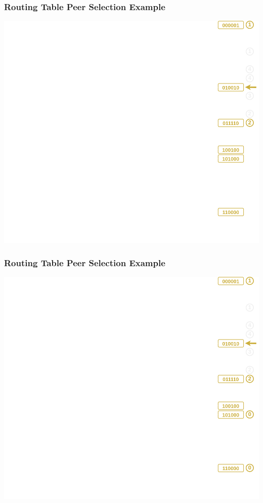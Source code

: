 \documentclass{../pl-slide}
\begin{document}
\begin{frame}
\frametitle{Routing Table Peer Selection Example}
\begin{center}
	\includegraphics[scale=.23]{resources/trie-features-bucket1.png}
\end{center}
\end{frame}

\begin{frame}
\frametitle{Routing Table Peer Selection Example}
\begin{center}
	\includegraphics[scale=.23]{resources/trie-features-bucket0.png}
\end{center}
\end{frame}
\end{document}
